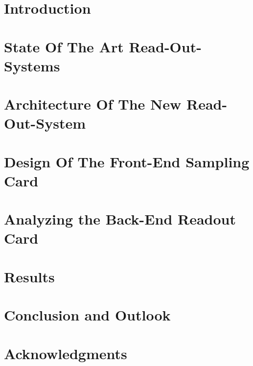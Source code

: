 \documentclass[dvipsnames,table]{include/thesisclass} %
\begin{document}
    \FrontMatter
    
	\tikzexternaldisable
    
    \tikzexternalenable
    
       
	
    \begingroup      %
    \tableofcontents %
    \listoffigures
    \listoftables
    \printglossary
    \endgroup
    \cleardoublepage

    \MainMatter
    \chapter{Introduction}
   	\chapter{State Of The Art Read-Out-Systems}
   	\chapter{Architecture Of The New Read-Out-System}
   			
   	\chapter{Design Of The Front-End Sampling Card}
   			
   	\chapter{Analyzing the Back-End Readout Card}
	\chapter{Results}	
    \chapter{Conclusion and Outlook}
   					
	\chapter*{Acknowledgments}
			
	
    \Appendix
    \chapter*{\appendixname} 
    		

	\TheBibliography
	
	
\end{document}
